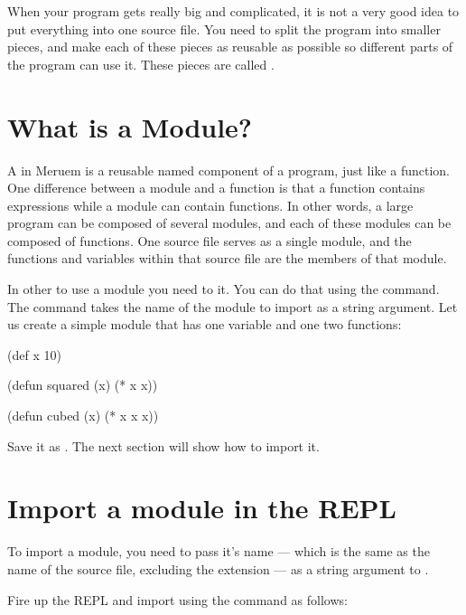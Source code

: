 When your program gets really big and complicated, it is not a very good idea to put everything into one source file. You need to split the program into smaller pieces, and make each of these pieces as reusable as possible so different parts of the program can use it. These pieces are called .

\section{What is a Module?}
A  in Meruem is a reusable named component of a program, just like a function. One difference between a module and a function is that a function contains expressions while a module can contain functions. In other words, a large program can be composed of several modules, and each of these modules can be composed of functions. One source file serves as a single module, and the functions and variables within that source file are the members of that module. 

In other to use a module you need to  it. You can do that using the  command. The  command takes the name of the module to import as a string argument. Let us create a simple module that has one variable and one two functions:

\begin{Meruem}
(def x 10)

(defun squared (x) (* x x))

(defun cubed (x) (* x x x))
\end{Meruem}

Save it as . The next section will show how to import it.

\section{Import a module in the REPL}
To import a module, you need to pass it's name --- which is the same as the name of the source file, excluding the  extension --- as a string argument to .

Fire up the REPL and import  using the  command as follows:

\begin{REPL}
meruem> (import "module_demo")
SomeModule(module_demo, MutableList(/home/melvic/meruem/lib/prelude), ArrayBuffer(cubed, module, x, squared)})
\end{REPL}

